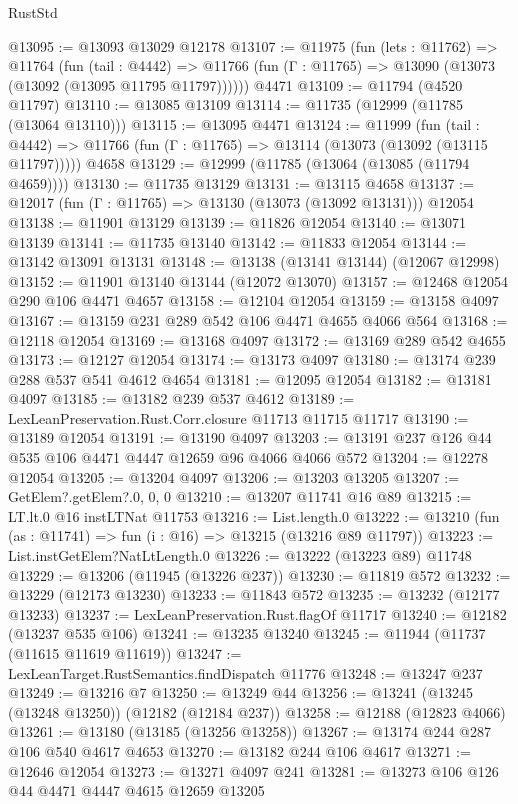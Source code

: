 \begin{lexlean}{RustStd}
\begin{coremodule}
{\begin{coremodule}
{{{{{{{{{{{{{{{{{{{{{{{{{{{{{{{{{{{{{{{{{{{{{{{{{{{{{{{{{{{{{{{{{{{{@13095 := @13093 @13029 @12178
@13107 := @11975
    (fun (lets : @11762) =>
    @11764
      (fun (tail : @4442) =>
      @11766 (fun (Γ : @11765) => @13090 (@13073 (@13092 (@13095 @11795 @11797))))))
    @4471
@13109 := @11794 (@4520 @11797)
@13110 := @13085 @13109
@13114 := @11735 (@12999 (@11785 (@13064 @13110)))
@13115 := @13095 @4471
@13124 := @11999
    (fun (tail : @4442) => @11766 (fun (Γ : @11765) => @13114 (@13073 (@13092 (@13115 @11797)))))
    @4658
@13129 := @12999 (@11785 (@13064 (@13085 (@11794 @4659))))
@13130 := @11735 @13129
@13131 := @13115 @4658
@13137 := @12017 (fun (Γ : @11765) => @13130 (@13073 (@13092 @13131))) @12054
@13138 := @11901 @13129
@13139 := @11826 @12054
@13140 := @13071 @13139
@13141 := @11735 @13140
@13142 := @11833 @12054
@13144 := @13142 @13091 @13131
@13148 := @13138 (@13141 @13144) (@12067 @12998)
@13152 := @11901 @13140 @13144 (@12072 @13070)
@13157 := @12468 @12054 @290 @106 @4471 @4657
@13158 := @12104 @12054
@13159 := @13158 @4097
@13167 := @13159 @231 @289 @542 @106 @4471 @4655 @4066 @564
@13168 := @12118 @12054
@13169 := @13168 @4097
@13172 := @13169 @289 @542 @4655
@13173 := @12127 @12054
@13174 := @13173 @4097
@13180 := @13174 @239 @288 @537 @541 @4612 @4654
@13181 := @12095 @12054
@13182 := @13181 @4097
@13185 := @13182 @239 @537 @4612
@13189 := LexLeanPreservation.Rust.Corr.closure @11713 @11715 @11717
@13190 := @13189 @12054
@13191 := @13190 @4097
@13203 := @13191 @237 @126 @44 @535 @106 @4471 @4447 @12659 @96 @4066 @4066 @572
@13204 := @12278 @12054
@13205 := @13204 @4097
@13206 := @13203 @13205
@13207 := GetElem?.getElem?.{0, 0, 0}
@13210 := @13207 @11741 @16 @89
@13215 := LT.lt.{0} @16 instLTNat @11753
@13216 := List.length.{0}
@13222 := @13210 (fun (as : @11741) => fun (i : @16) => @13215 (@13216 @89 @11797))
@13223 := List.instGetElem?NatLtLength.{0}
@13226 := @13222 (@13223 @89) @11748
@13229 := @13206 (@11945 (@13226 @237))
@13230 := @11819 @572
@13232 := @13229 (@12173 @13230)
@13233 := @11843 @572
@13235 := @13232 (@12177 @13233)
@13237 := LexLeanPreservation.Rust.flagOf @11717
@13240 := @12182 (@13237 @535 @106)
@13241 := @13235 @13240
@13245 := @11944 (@11737 (@11615 @11619 @11619))
@13247 := LexLeanTarget.RustSemantics.findDispatch @11776
@13248 := @13247 @237
@13249 := @13216 @7
@13250 := @13249 @44
@13256 := @13241 (@13245 (@13248 @13250)) (@12182 (@12184 @237))
@13258 := @12188 (@12823 @4066)
@13261 := @13180 (@13185 (@13256 @13258))
@13267 := @13174 @244 @287 @106 @540 @4617 @4653
@13270 := @13182 @244 @106 @4617
@13271 := @12646 @12054
@13273 := @13271 @4097 @241
@13281 := @13273 @106 @126 @44 @4471 @4447 @4615 @12659 @13205
}}}}}}}}}}}}}}}}}}}}}}}}}}}}}}}}}}}}}}}}}}}}}}}}}}}}}}}}}}}}}}}}}}}}
\end{coremodule}}
\end{coremodule}
\end{lexlean}
